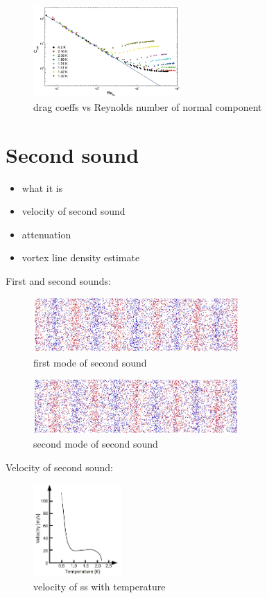 \begin{figure}[h]
	\centering
	\includegraphics[width=0.5\textwidth]{graphics/theory/C-Re_normal}
	\caption{drag coeffs vs Reynolds number of normal component}
	\label{C-Re_normal}
\end{figure}

\section{Second sound}
\begin{itemize}
	\item what it is
	\item velocity of second sound
	\item attenuation
	\item vortex line density estimate
\end{itemize}

First and second sounds:

\begin{figure}[h]
	\centering
	\includegraphics[width=0.7\textwidth]{graphics/theory/ss_1}
	\caption{first mode of second sound}
	\label{ss_1}
\end{figure}

\begin{figure}[h]
	\centering
	\includegraphics[width=0.7\textwidth]{graphics/theory/ss_2}
	\caption{second mode of second sound}
	\label{ss_2}
\end{figure}

Velocity of second sound:

\begin{figure}[h]
	\centering
	\includegraphics[width=0.3\textwidth]{graphics/theory/ss_velocity}
	\caption{velocity of ss with temperature}
	\label{ss_velocity}
\end{figure}


\newpage

